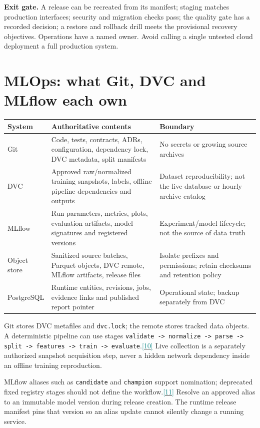 \documentclass[10pt,letterpaper]{article}
\newcommand{\sr}[1]{\hyperlink{src#1}{\textcolor{teal}{[#1]}}}
\newcommand{\key}[1]{\textbf{\color{ink}#1}}
\newcommand{\nextsection}[1]{\clearpage\section{#1}}
\begin{document}
\key{Exit gate.} A release can be recreated from its manifest; staging matches production interfaces; security and migration checks pass; the quality gate has a recorded decision; a restore and rollback drill meets the provisional recovery objectives. Operations have a named owner. Avoid calling a single untested cloud deployment a full production system.

\nextsection{MLOps: what Git, DVC and MLflow each own}
\begin{tabularx}{\linewidth}{p{0.85in}YY}
\toprule
System & Authoritative contents & Boundary \\
\midrule
Git & Code, tests, contracts, ADRs, configuration, dependency lock, DVC metadata, split manifests & No secrets or growing source archives \\
DVC & Approved raw/normalized training snapshots, labels, offline pipeline dependencies and outputs & Dataset reproducibility; not the live database or hourly archive catalog \\
MLflow & Run parameters, metrics, plots, evaluation artifacts, model signatures and registered versions & Experiment/model lifecycle; not the source of data truth \\
Object store & Sanitized source batches, Parquet objects, DVC remote, MLflow artifacts, release files & Isolate prefixes and permissions; retain checksums and retention policy \\
PostgreSQL & Runtime entities, revisions, jobs, evidence links and published report pointer & Operational state; backup separately from DVC \\
\bottomrule
\end{tabularx}

Git stores DVC metafiles and \texttt{dvc.lock}; the remote stores tracked data objects. A deterministic pipeline can use stages \texttt{validate -> normalize -> parse -> split -> features -> train -> evaluate}.\sr{10} Live collection is a separately authorized snapshot acquisition step, never a hidden network dependency inside an offline training reproduction.

MLflow aliases such as \texttt{candidate} and \texttt{champion} support nomination; deprecated fixed registry stages should not define the workflow.\sr{11} Resolve an approved alias to an immutable model version during release creation. The runtime release manifest pins that version so an alias update cannot silently change a running service.
\end{document}
